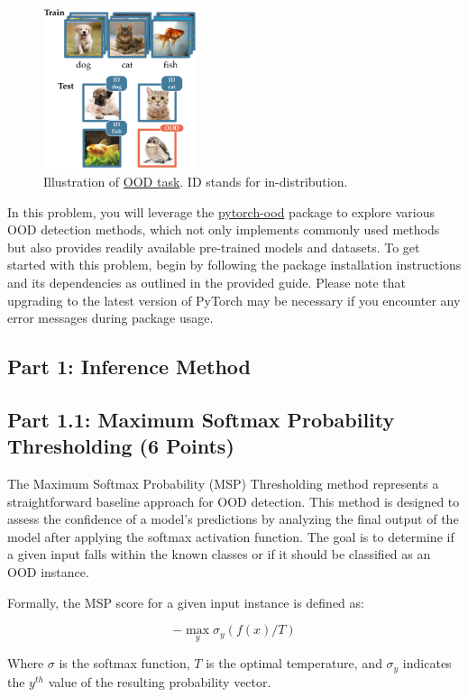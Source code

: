 \documentclass[11pt, oneside]{article}   	%
\begin{document}
\begin{figure}[h]
    \centering
    \includegraphics[width=0.4\textwidth]{images/ood.png}
    \caption{
    Illustration of \href{https://arxiv.org/pdf/2110.11334.pdf}{OOD task}. ID stands for in-distribution.
    }
    \label{fig:lora}
\end{figure}

In this problem, you will leverage the \href{https://github.com/kkirchheim/pytorch-ood}{pytorch-ood} package to explore various OOD detection methods, which not only implements commonly used methods but also provides readily available pre-trained models and datasets.
To get started with this problem, begin by following the package installation instructions and its dependencies as outlined in the provided guide. Please note that upgrading to the latest version of PyTorch may be necessary if you encounter any error messages during package usage.
\subsection*{Part 1: Inference Method}
\label{sec:part1}
\subsection*{Part 1.1: Maximum Softmax Probability Thresholding (6 Points)}
The Maximum Softmax Probability (MSP) Thresholding method represents a straightforward baseline approach for OOD detection. This method is designed to assess the confidence of a model's predictions by analyzing the final output of the model after applying the softmax activation function. The goal is to determine if a given input falls within the known classes or if it should be classified as an OOD instance.

Formally, the MSP score for a given input instance is defined as:

$$- \max_y \sigma_y(f(x) / T)$$

Where $\sigma$ is the softmax function, $T$ is the optimal temperature, and $\sigma_y$ indicates the $y^{th}$ value of the resulting probability vector. 
\end{document}
